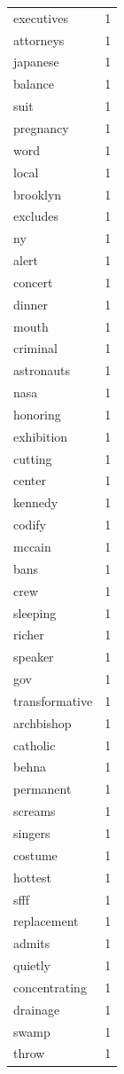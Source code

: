 \begin{tabular}{lr}
executives & 1 \\
attorneys & 1 \\
japanese & 1 \\
balance & 1 \\
suit & 1 \\
pregnancy & 1 \\
word & 1 \\
local & 1 \\
brooklyn & 1 \\
excludes & 1 \\
ny & 1 \\
alert & 1 \\
concert & 1 \\
dinner & 1 \\
mouth & 1 \\
criminal & 1 \\
astronauts & 1 \\
nasa & 1 \\
honoring & 1 \\
exhibition & 1 \\
cutting & 1 \\
center & 1 \\
kennedy & 1 \\
codify & 1 \\
mccain & 1 \\
bans & 1 \\
crew & 1 \\
sleeping & 1 \\
richer & 1 \\
speaker & 1 \\
gov & 1 \\
transformative & 1 \\
archbishop & 1 \\
catholic & 1 \\
behna & 1 \\
permanent & 1 \\
screams & 1 \\
singers & 1 \\
costume & 1 \\
hottest & 1 \\
sfff & 1 \\
replacement & 1 \\
admits & 1 \\
quietly & 1 \\
concentrating & 1 \\
drainage & 1 \\
swamp & 1 \\
throw & 1 \\

\end{tabular}
